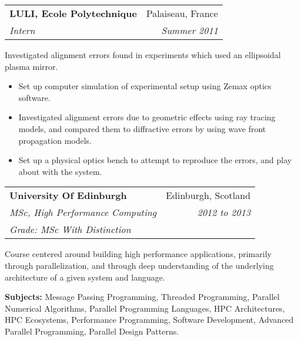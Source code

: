 \documentclass[11pt]{article}
\makeatletter
\newcommand{\resumeSection}[1]{
    \par
    \vspace{\baselineskip}
    \large {\sc {#1}}
    \par
    \vspace{-0.9\baselineskip}
    \hrulefill
    \vspace{0.5\baselineskip}
    \par
}
\newenvironment{resumeSubSectionHeader}{
    \par
    \begin{tabular*}{\textwidth}{l@{\extracolsep{\fill}}r}
    \par
} {
    \end{tabular*}
    \par
}
\newenvironment{resumeSubSectionBody}{
    \par
    \vspace{-0.8\parskip}
    \begin{small}
    \par
} {
    \par
    \end{small}
    \par
}
\makeatother
\begin{document}
%
%
\begin{resumeSubSectionHeader}

    \textbf{LULI, Ecole Polytechnique} & Palaiseau, France \\
    \emph{Intern}                      & \emph{Summer 2011}

\end{resumeSubSectionHeader}
\begin{resumeSubSectionBody}

    Investigated alignment errors found in experiments which used an
    ellipsoidal plasma mirror.

    \begin{itemize}
        \item
            Set up computer simulation of experimental setup using
            Zemax optics software.

        \item
            Investigated alignment errors due to geometric effects
            using ray tracing models, and compared them
            to diffractive errors by using wave front propagation models.

        \item
            Set up a physical optics bench to attempt to reproduce the
            errors, and play about with the system.
    \end{itemize}

\end{resumeSubSectionBody}


\resumeSection{Education \& Training}


%
%
\begin{resumeSubSectionHeader}

    \textbf{University Of Edinburgh}       & Edinburgh, Scotland\\
    \emph{MSc, High Performance Computing} & \emph{2012 to 2013} \\
    \emph{Grade: MSc With Distinction}

\end{resumeSubSectionHeader}
\begin{resumeSubSectionBody}

    Course centered around building high performance applications,
    primarily through parallelization, and through deep understanding
    of the underlying architecture of a given system and language.

    \begin{description}
        \item{\bf Subjects:}
            Message Passing Programming, Threaded Programming,
            Parallel Numerical Algorithms,
            Parallel Programming Languages, HPC Architectures,
            HPC Ecosystems, Performance Programming,
            Software Development, Advanced Parallel Programming,
            Parallel Design Patterns.
    \end{description}

\end{resumeSubSectionBody}
\end{document}
